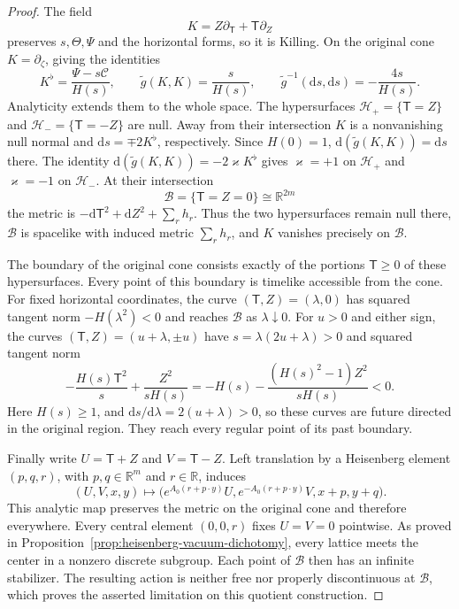 \documentclass[10pt,a4paper]{article}
\numberwithin{equation}{section}
\theoremstyle{definition}
\theoremstyle{remark}
\newcommand{\dd}{\mathrm d}
\begin{document}
\begin{proof}
The field
\[
 K=Z\partial_{\mathsf T}+\mathsf T\partial_Z
\]
preserves $s,\Theta,\Psi$ and the horizontal forms, so it is Killing.
On the original cone $K=\partial_\zeta$, giving the identities
\begin{equation}
 K^\flat=\frac{\Psi-s\mathcal C}{H(s)},\qquad
 \widetilde g(K,K)=\frac{s}{H(s)},\qquad
 \widetilde g^{-1}(\dd s,\dd s)=-\frac{4s}{H(s)}.
 \label{eq:heisenberg-bifurcate-identities}
\end{equation}
Analyticity extends them to the whole space.  The hypersurfaces
$\mathcal H_+=\{\mathsf T=Z\}$ and
$\mathcal H_-=\{\mathsf T=-Z\}$ are null.  Away from their
intersection $K$ is a nonvanishing null normal and
$\dd s=\mp2K^\flat$, respectively.  Since $H(0)=1$,
$\dd(\widetilde g(K,K))=\dd s$ there.  The identity
$\dd(\widetilde g(K,K))=-2\varkappa K^\flat$ gives
$\varkappa=+1$ on $\mathcal H_+$ and $\varkappa=-1$ on
$\mathcal H_-$.  At their intersection
\[
 \mathcal B=\{\mathsf T=Z=0\}\cong\mathbb R^{2m}
\]
the metric is $-\dd\mathsf T^2+\dd Z^2+\sum_rh_r$.
Thus the two hypersurfaces remain null there, $\mathcal B$ is
spacelike with induced metric $\sum_rh_r$, and $K$ vanishes
precisely on $\mathcal B$.

The boundary of the original cone consists exactly of the portions
$\mathsf T\ge0$ of these hypersurfaces.  Every point of this
boundary is timelike accessible from the cone.  For fixed horizontal
coordinates, the curve $(\mathsf T,Z)=(\lambda,0)$ has squared
tangent norm $-H(\lambda^2)<0$ and reaches $\mathcal B$ as
$\lambda\downarrow0$.  For $u>0$ and either sign, the curves
$(\mathsf T,Z)=(u+\lambda,\pm u)$ have
$s=\lambda(2u+\lambda)>0$ and squared tangent norm
\[
 -\frac{H(s)\mathsf T^2}{s}
       +\frac{Z^2}{sH(s)}
 =-H(s)-\frac{(H(s)^2-1)Z^2}{sH(s)}<0.
\]
Here $H(s)\ge1$, and $\dd s/\dd\lambda=2(u+\lambda)>0$,
so these curves are future directed in the original region.
They reach every regular point of its past boundary.

Finally write $U=\mathsf T+Z$ and $V=\mathsf T-Z$.
Left translation by a Heisenberg element $(p,q,r)$, with
$p,q\in\mathbb R^m$ and $r\in\mathbb R$, induces
\[
 (U,V,x,y)\longmapsto
 \bigl(e^{A_0(r+p\cdot y)}U,
       e^{-A_0(r+p\cdot y)}V,x+p,y+q\bigr).
\]
This analytic map preserves the metric on the original cone and
therefore everywhere.  Every central element $(0,0,r)$ fixes
$U=V=0$ pointwise.  As proved in
Proposition~\ref{prop:heisenberg-vacuum-dichotomy}, every lattice
meets the center in a nonzero discrete subgroup.  Each point of
$\mathcal B$ then has an infinite stabilizer.  The resulting action
is neither free nor properly discontinuous at $\mathcal B$,
which proves the asserted limitation on this quotient construction.
\end{proof}
\end{document}
